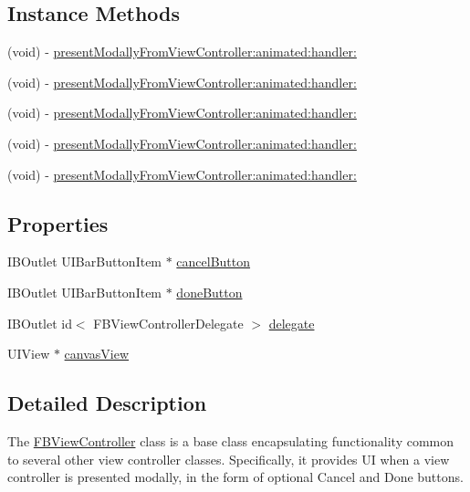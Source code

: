 \subsection*{Instance Methods}
\begin{DoxyCompactItemize}
\item 
(void) -\/ \hyperlink{interfaceFBViewController_a6e888b9625ed06aaa0c952cf4871b739}{present\+Modally\+From\+View\+Controller\+:animated\+:handler\+:}
\item 
(void) -\/ \hyperlink{interfaceFBViewController_a6e888b9625ed06aaa0c952cf4871b739}{present\+Modally\+From\+View\+Controller\+:animated\+:handler\+:}
\item 
(void) -\/ \hyperlink{interfaceFBViewController_a6e888b9625ed06aaa0c952cf4871b739}{present\+Modally\+From\+View\+Controller\+:animated\+:handler\+:}
\item 
(void) -\/ \hyperlink{interfaceFBViewController_a6e888b9625ed06aaa0c952cf4871b739}{present\+Modally\+From\+View\+Controller\+:animated\+:handler\+:}
\item 
(void) -\/ \hyperlink{interfaceFBViewController_a6e888b9625ed06aaa0c952cf4871b739}{present\+Modally\+From\+View\+Controller\+:animated\+:handler\+:}
\end{DoxyCompactItemize}
\subsection*{Properties}
\begin{DoxyCompactItemize}
\item 
I\+B\+Outlet U\+I\+Bar\+Button\+Item $\ast$ \hyperlink{interfaceFBViewController_a5a9afc903239982c07f640583edce7a0}{cancel\+Button}
\item 
I\+B\+Outlet U\+I\+Bar\+Button\+Item $\ast$ \hyperlink{interfaceFBViewController_abaf42501d996999bd284cb9b6ca7f867}{done\+Button}
\item 
I\+B\+Outlet id$<$ F\+B\+View\+Controller\+Delegate $>$ \hyperlink{interfaceFBViewController_a3503cf149369a8aec7f80369317f0af3}{delegate}
\item 
U\+I\+View $\ast$ \hyperlink{interfaceFBViewController_a854f912e8536ad03e99b9a6311d96d45}{canvas\+View}
\end{DoxyCompactItemize}


\subsection{Detailed Description}
The {\ttfamily \hyperlink{interfaceFBViewController}{F\+B\+View\+Controller}} class is a base class encapsulating functionality common to several other view controller classes. Specifically, it provides UI when a view controller is presented modally, in the form of optional Cancel and Done buttons. 

